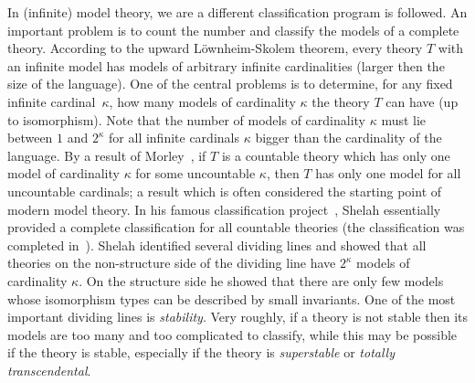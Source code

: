 \smallskip

In (infinite) model theory, we are a different classification program is followed. An important 
problem is to count the number and classify the models of a complete theory. According
to the upward L\"ownheim-Skolem theorem, every theory $T$ with an infinite model has
models of arbitrary infinite cardinalities (larger then the size of the language). One of the central problems
 is to determine, for any fixed infinite cardinal~$\kappa$, how many models of cardinality 
$\kappa$ the theory $T$ can have (up to isomorphism). Note that the number of
models of cardinality $\kappa$ must lie between $1$ and $2^\kappa$ for all infinite cardinals $\kappa$ 
bigger than the cardinality of the language. By a result of 
Morley~\cite{morley1965categoricity}, if $T$ is a countable
theory which has only one model of cardinality $\kappa$ for some uncountable $\kappa$, 
then $T$ has only one model for all uncountable cardinals; a result which 
is often considered the starting point of modern model theory. In his famous classification
project~\cite{shelah1990classification}, Shelah essentially provided a complete
classification for all countable theories (the classification was completed 
in~\cite{hart2000uncountable}). Shelah identified several dividing lines and showed that
all theories on the non-structure side of the dividing line have $2^\kappa$ models
of cardinality $\kappa$. On
the structure side he showed that there are only few models whose isomorphism 
types can be described by small invariants. One of the most important dividing 
lines is \emph{stability}. Very roughly, if a theory is not stable then its models 
are too many and too complicated to classify, while this may be possible if the theory is stable, 
especially if the theory is \emph{superstable} or \emph{totally transcendental}.

